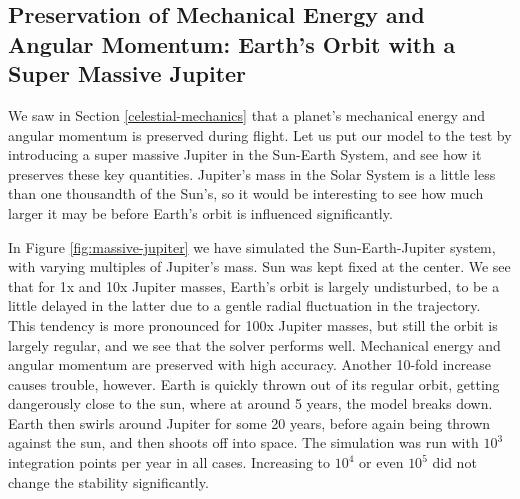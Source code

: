 \documentclass[]{article}
\begin{document}
\subsection{Preservation of Mechanical Energy and Angular Momentum: Earth's Orbit with a Super Massive Jupiter}
We saw in Section \ref{celestial-mechanics} that a planet's mechanical energy and angular momentum is preserved during flight. Let us put our model to the test by introducing a super massive Jupiter in the Sun-Earth System, and see how it preserves these key quantities. Jupiter's mass in the Solar System is a little less than one thousandth of the Sun's, so it would be interesting to see how much larger it may be before Earth's orbit is influenced significantly. 

In Figure \ref{fig:massive-jupiter} we have simulated the Sun-Earth-Jupiter system, with varying multiples of Jupiter's mass. Sun was kept fixed at the center. We see that for 1x and 10x Jupiter masses, Earth's orbit is largely undisturbed, to be a little delayed in the latter due to a gentle radial fluctuation in the trajectory. This tendency is more pronounced for 100x Jupiter masses, but still the orbit is largely regular, and we see that the solver performs well. Mechanical energy and angular momentum are preserved with high accuracy. Another 10-fold increase causes trouble, however. Earth is quickly thrown out of its regular orbit, getting dangerously close to the sun, where at around 5 years, the model breaks down. Earth then swirls around Jupiter for some 20 years, before again being thrown against the sun, and then shoots off into space. The simulation was run with $10^3$ integration points per year in all cases. Increasing to $10^4$ or even $10^5$ did not change the stability significantly.
\end{document}
